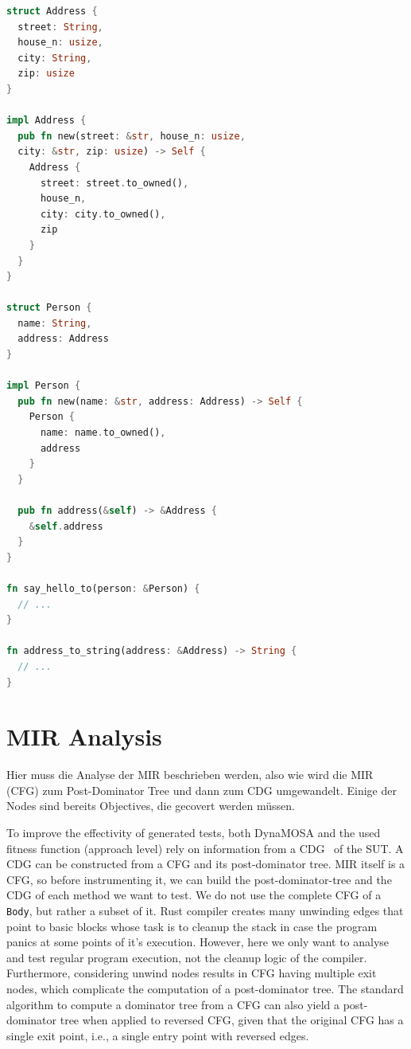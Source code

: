 \documentclass[paper=a4,%
  twoside,%
  BCOR4mm,%
  abstract=true,%
  toc=bibliography,%
  chapterprefix=true,%
  toc=bibliographynumbered,%
  open=right,%
  english,%
  pagesize=pdftex]{scrreprt}
\begin{document}
\begin{lstlisting}[language=Rust, style=boxed, caption={After HIR analysis, we know how a \lstinline{Person} object can be generated to be used in \lstinline{say_hello_to}.}, label=lst:hir-analysis-example]
struct Address {
  street: String,
  house_n: usize,
  city: String,
  zip: usize
}

impl Address {
  pub fn new(street: &str, house_n: usize,
  city: &str, zip: usize) -> Self {
    Address {
      street: street.to_owned(),
      house_n,
      city: city.to_owned(),
      zip
    }
  }
}

struct Person {
  name: String,
  address: Address
}

impl Person {
  pub fn new(name: &str, address: Address) -> Self {
    Person {
      name: name.to_owned(),
      address
    }
  }

  pub fn address(&self) -> &Address {
    &self.address
  }
}

fn say_hello_to(person: &Person) {
  // ...
}

fn address_to_string(address: &Address) -> String {
  // ...
}
\end{lstlisting}

\section{MIR Analysis}
Hier muss die Analyse der MIR beschrieben werden, also wie wird die MIR (CFG) zum Post-Dominator Tree und dann zum CDG umgewandelt. Einige der Nodes sind bereits Objectives, die gecovert werden müssen.

To improve the effectivity of generated tests, both DynaMOSA and the used fitness function (approach level) rely on information from a \ac{CDG}~\cite{Ferrante1987} of the \ac{SUT}. A \ac{CDG} can be constructed from a \ac{CFG} and its post-dominator tree. \ac{MIR} itself is a \ac{CFG}, so before instrumenting it, we can build the post-dominator-tree and the \ac{CDG} of each method we want to test. We do not use the complete \ac{CFG} of a \lstinline{Body}, but rather a subset of it. Rust compiler creates many unwinding edges that point to basic blocks whose task is to cleanup the stack in case the program panics at some points of it's execution. However, here we only want to analyse and test regular program execution, not the cleanup logic of the compiler. Furthermore, considering unwind nodes results in \ac{CFG} having multiple exit nodes, which complicate the computation of a post-dominator tree. The standard algorithm to compute a dominator tree from a \ac{CFG} can also yield a post-dominator tree when applied to reversed \ac{CFG}, given that the original \ac{CFG} has a single exit point, i.e., a single entry point with reversed edges.
\end{document}
